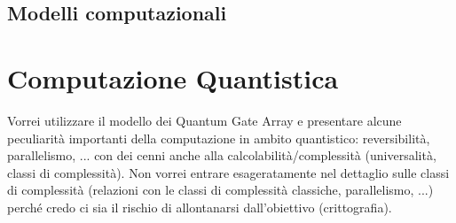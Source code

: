 \documentclass[11pt,a4paper]{book} %
\begin{document}
\section{Modelli computazionali}






\chapter{Computazione Quantistica}
Vorrei utilizzare il modello dei Quantum Gate Array e presentare alcune peculiarità importanti della computazione in ambito quantistico: reversibilità, parallelismo, ... con dei cenni anche alla calcolabilità/complessità (universalità, classi di complessità). Non vorrei entrare esageratamente nel dettaglio sulle classi di complessità (relazioni con le classi di complessità classiche, parallelismo, ...) perché credo ci sia il rischio di allontanarsi dall'obiettivo (crittografia).




\backmatter
\cleardoublepage
{}
\nocite{*} %
\printbibliography
\end{document}
